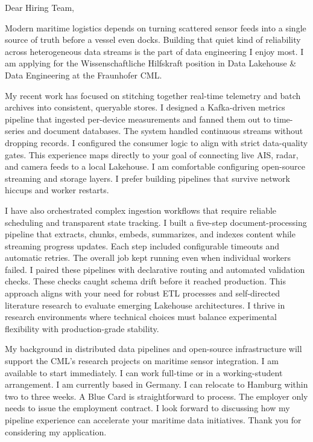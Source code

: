 \documentclass[11pt,a4paper]{coverletter}
\begin{document}

\opening{Dear Hiring Team,}

Modern maritime logistics depends on turning scattered sensor feeds into a single source of truth before a vessel even docks. Building that quiet kind of reliability across heterogeneous data streams is the part of data engineering I enjoy most. I am applying for the Wissenschaftliche Hilfskraft position in Data Lakehouse \& Data Engineering at the Fraunhofer CML.

My recent work has focused on stitching together real-time telemetry and batch archives into consistent, queryable stores. I designed a Kafka-driven metrics pipeline that ingested per-device measurements and fanned them out to time-series and document databases. The system handled continuous streams without dropping records. I configured the consumer logic to align with strict data-quality gates. This experience maps directly to your goal of connecting live AIS, radar, and camera feeds to a local Lakehouse. I am comfortable configuring open-source streaming and storage layers. I prefer building pipelines that survive network hiccups and worker restarts.

I have also orchestrated complex ingestion workflows that require reliable scheduling and transparent state tracking. I built a five-step document-processing pipeline that extracts, chunks, embeds, summarizes, and indexes content while streaming progress updates. Each step included configurable timeouts and automatic retries. The overall job kept running even when individual workers failed. I paired these pipelines with declarative routing and automated validation checks. These checks caught schema drift before it reached production. This approach aligns with your need for robust ETL processes and self-directed literature research to evaluate emerging Lakehouse architectures. I thrive in research environments where technical choices must balance experimental flexibility with production-grade stability.

My background in distributed data pipelines and open-source infrastructure will support the CML’s research projects on maritime sensor integration. I am available to start immediately. I can work full-time or in a working-student arrangement. I am currently based in Germany. I can relocate to Hamburg within two to three weeks. A Blue Card is straightforward to process. The employer only needs to issue the employment contract. I look forward to discussing how my pipeline experience can accelerate your maritime data initiatives. Thank you for considering my application.
\end{document}
